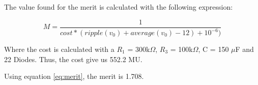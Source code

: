 The value found for the merit is calculated with the following expression:

\begin{equation}
  M= \frac{1}{cost * (ripple(v_0)+average(v_0)-12)+10^{-6})}
  \label{eq:merit}
\end{equation}

Where the cost is calculated with a $R_1$ = 300k$\Omega$, $R_3$ = 100k$ \Omega$, C = 150 $\mu$F and 22 Diodes.
Thus, the cost give us 552.2 MU.

Using equation \ref{eq:merit}, the merit is 1.708.


















